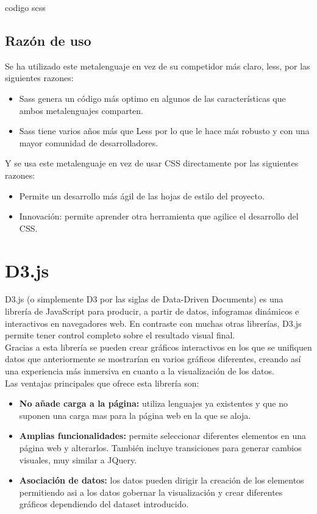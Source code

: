 \begin{codigo}
	codigo scss
\end{codigo}


\subsection{Razón de uso}
Se ha utilizado este metalenguaje en vez de su competidor más claro, less, por las siguientes razones:

\begin{itemize}
	\item Sass genera un código más optimo en algunos de las características que ambos metalenguajes comparten.
	\item Sass tiene varios años más que Less por lo que le hace más robusto y con una mayor comunidad de desarrolladores.
\end{itemize}

Y se usa este metalenguaje en vez de usar CSS directamente por las siguientes razones:

\begin{itemize}
	\item Permite un desarrollo más ágil de las hojas de estilo del proyecto.
	\item Innovación: permite aprender otra herramienta que agilice el desarrollo del CSS.
\end{itemize}

\section{D3.js}
D3.js (o simplemente D3 por las siglas de Data-Driven Documents) es una librería de JavaScript para producir, a partir de datos, infogramas dinámicos e interactivos en navegadores web. En contraste con muchas otras librerías, D3.js permite tener control completo sobre el resultado visual final.\\

Gracias a esta librería se pueden crear gráficos interactivos en los que se unifiquen datos que anteriormente se mostrarían en varios gráficos diferentes, creando así una experiencia más inmersiva en cuanto a la visualización de los datos. \\

Las ventajas principales que ofrece esta librería son:
\begin{itemize}
	\item \textbf{No añade carga a la página:} utiliza lenguajes ya existentes y que no suponen una carga mas para la página web en la que se aloja.
	\item \textbf{Amplias funcionalidades:} permite seleccionar diferentes elementos en una página web y alterarlos. También incluye transiciones para generar cambios visuales, muy similar a JQuery.
	\item \textbf{Asociación de datos:} los datos pueden dirigir la creación de los elementos permitiendo asi a los datos gobernar la visualización y crear diferentes gráficos dependiendo del dataset introducido.
\end{itemize}

